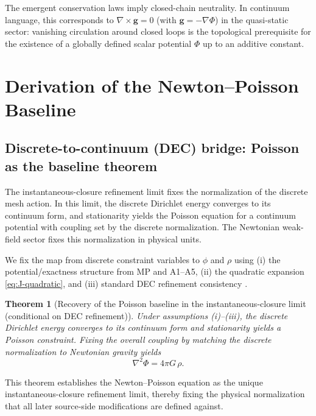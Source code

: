\documentclass[entropy,article,submit,pdftex,moreauthors]{Definitions/mdpi}
\newtheorem{theoremX}{Theorem}[section]
\begin{document}
The emergent conservation laws imply closed-chain neutrality. In continuum language, this corresponds to \(\nabla\times \mathbf{g}=0\) (with \(\mathbf{g}=-\nabla\Phi\)) in the quasi-static sector: vanishing circulation around closed loops is the topological prerequisite for the existence of a globally defined scalar potential \(\Phi\) up to an additive constant.

\section{Derivation of the Newton--Poisson Baseline}
\label{sec:baseline}

\subsection{Discrete-to-continuum (DEC) bridge: Poisson as the baseline theorem}
\label{subsec:dec}

The instantaneous-closure refinement limit fixes the normalization of the discrete mesh action. In this limit, the discrete Dirichlet energy converges to its continuum form, and stationarity yields the Poisson equation for a continuum potential with coupling set by the discrete normalization. The Newtonian weak-field sector fixes this normalization in physical units.

We fix the map from discrete constraint variables to 
$\phi$ and $\rho$ using (i) the potential/exactness structure from MP and A1--A5, (ii) the quadratic expansion \eqref{eq:J-quadratic}, and (iii) standard DEC refinement consistency \cite{bossavit1998,hirani2003,desbrun2005}.

\begin{theoremX}[Recovery of the Poisson baseline in the instantaneous-closure limit (conditional on DEC refinement)]
\label{dr:poisson}
Under assumptions (i)--(iii), the discrete Dirichlet energy converges to its continuum form and stationarity yields a Poisson constraint. Fixing the overall coupling by matching the discrete normalization to Newtonian gravity yields
\begin{equation}
  \nabla^2 \Phi = 4\pi G\,\rho.
  \label{eq:poisson}
\end{equation}
\end{theoremX}
This theorem establishes the Newton–Poisson equation as the unique instantaneous-closure refinement limit, thereby fixing the physical normalization that all later source-side modifications are defined against.
\end{document}
